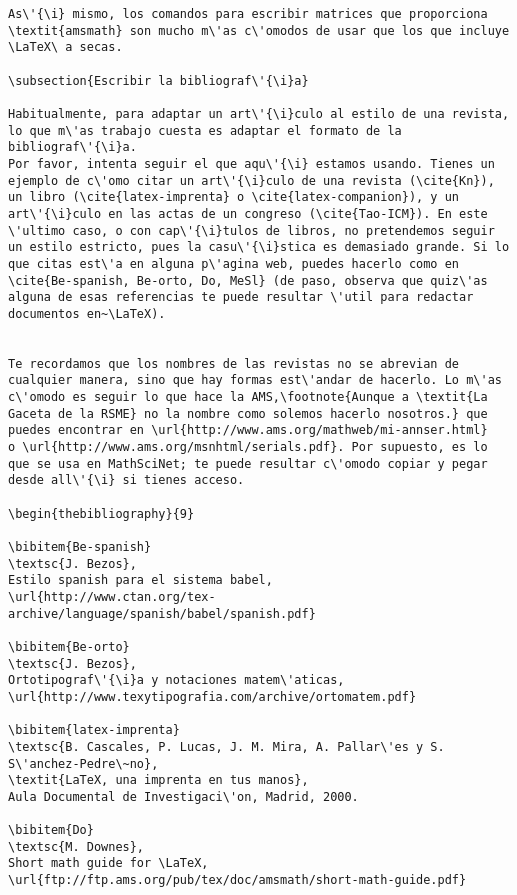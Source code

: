 \documentclass[11pt, a4paper]{article}
\begin{document}
\begin{lstlisting}
As\'{\i} mismo, los comandos para escribir matrices que proporciona \textit{amsmath} son mucho m\'as c\'omodos de usar que los que incluye \LaTeX\ a secas.

\subsection{Escribir la bibliograf\'{\i}a}

Habitualmente, para adaptar un art\'{\i}culo al estilo de una revista, lo que m\'as trabajo cuesta es adaptar el formato de la bibliograf\'{\i}a. 
Por favor, intenta seguir el que aqu\'{\i} estamos usando. Tienes un ejemplo de c\'omo citar un art\'{\i}culo de una revista (\cite{Kn}), un libro (\cite{latex-imprenta} o \cite{latex-companion}), y un art\'{\i}culo en las actas de un congreso (\cite{Tao-ICM}). En este \'ultimo caso, o con cap\'{\i}tulos de libros, no pretendemos seguir un estilo estricto, pues la casu\'{\i}stica es demasiado grande. Si lo que citas est\'a en alguna p\'agina web, puedes hacerlo como en \cite{Be-spanish, Be-orto, Do, MeSl} (de paso, observa que quiz\'as alguna de esas referencias te puede resultar \'util para redactar documentos en~\LaTeX).


Te recordamos que los nombres de las revistas no se abrevian de cualquier manera, sino que hay formas est\'andar de hacerlo. Lo m\'as c\'omodo es seguir lo que hace la AMS,\footnote{Aunque a \textit{La Gaceta de la RSME} no la nombre como solemos hacerlo nosotros.} que puedes encontrar en \url{http://www.ams.org/mathweb/mi-annser.html}
o \url{http://www.ams.org/msnhtml/serials.pdf}. Por supuesto, es lo que se usa en MathSciNet; te puede resultar c\'omodo copiar y pegar desde all\'{\i} si tienes acceso.

\begin{thebibliography}{9}

\bibitem{Be-spanish}
\textsc{J. Bezos}, 
Estilo spanish para el sistema babel,
\url{http://www.ctan.org/tex-archive/language/spanish/babel/spanish.pdf}

\bibitem{Be-orto}
\textsc{J. Bezos}, 
Ortotipograf\'{\i}a y notaciones matem\'aticas,
\url{http://www.texytipografia.com/archive/ortomatem.pdf}

\bibitem{latex-imprenta}
\textsc{B. Cascales, P. Lucas, J. M. Mira, A. Pallar\'es y S. S\'anchez-Pedre\~no}, 
\textit{LaTeX, una imprenta en tus manos}, 
Aula Documental de Investigaci\'on, Madrid, 2000.

\bibitem{Do}
\textsc{M. Downes},
Short math guide for \LaTeX,
\url{ftp://ftp.ams.org/pub/tex/doc/amsmath/short-math-guide.pdf}


\end{lstlisting}
\end{document}
